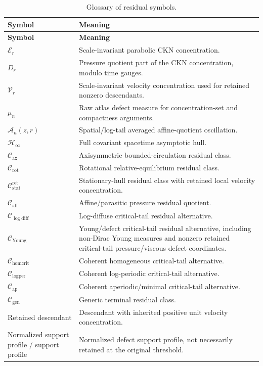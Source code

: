 \documentclass[11pt]{amsart}
\numberwithin{equation}{section}
\theoremstyle{plain}
\theoremstyle{definition}
\theoremstyle{remark}
\newcommand{\calE}{\mathcal E}
\newcommand{\Vel}{\mathcal V}
\newcommand{\calH}{\mathcal H}
\newcommand{\Cax}{\mathcal C_{\mathrm{ax}}}
\newcommand{\Crot}{\mathcal C_{\mathrm{rot}}}
\newcommand{\Cstat}{\mathcal C_{\mathrm{stat}}^{\mathrm{ret}}}
\newcommand{\Caff}{\mathcal C_{\mathrm{aff}}}
\newcommand{\Cgen}{\mathcal C_{\mathrm{gen}}}
\newcommand{\Chomcrit}{\mathcal C_{\mathrm{homcrit}}}
\newcommand{\Clogper}{\mathcal C_{\mathrm{logper}}}
\newcommand{\Capcrit}{\mathcal C_{\mathrm{ap}}}
\newcommand{\Cyoung}{\mathcal C_{\mathrm{Young}}}
\newcommand{\Clogdiff}{\mathcal C_{\log\mathrm{diff}}}
\begin{document}
\begin{longtable}{@{}L{0.28\textwidth}L{0.66\textwidth}@{}}
\caption{Glossary of residual symbols.}
\label{tab:typeI-glossary}\\
\hline
\textbf{Symbol} & \textbf{Meaning}\\
\hline
\endfirsthead
\hline
\textbf{Symbol} & \textbf{Meaning}\\
\hline
\endhead
\hline
\endfoot
\(\calE_r\) & Scale-invariant parabolic CKN concentration.\\
\(D_r\) & Pressure quotient part of the CKN concentration, modulo time gauges.\\
\(\Vel_r\) & Scale-invariant velocity concentration used for retained
nonzero descendants.\\
\(\mu_n\) & Raw atlas defect measure for concentration-set and compactness
arguments.\\
\(\mathcal A_n(z,r)\) & Spatial/log-tail averaged affine-quotient oscillation.\\
\(\calH_\infty\) & Full covariant spacetime asymptotic hull.\\
\(\Cax\) & Axisymmetric bounded-circulation residual class.\\
\(\Crot\) & Rotational relative-equilibrium residual class.\\
\(\Cstat\) & Stationary-hull residual class with retained local velocity concentration.\\
\(\Caff\) & Affine/parasitic pressure residual quotient.\\
\(\Clogdiff\) & Log-diffuse critical-tail residual alternative.\\
\(\Cyoung\) & Young/defect critical-tail residual alternative, including
non-Dirac Young measures and nonzero retained critical-tail pressure/viscous
defect coordinates.\\
\(\Chomcrit\) & Coherent homogeneous critical-tail alternative.\\
\(\Clogper\) & Coherent log-periodic critical-tail alternative.\\
\(\Capcrit\) & Coherent aperiodic/minimal critical-tail alternative.\\
\(\Cgen\) & Generic terminal residual class.\\
Retained descendant & Descendant with inherited positive unit velocity concentration.\\
Normalized support profile / support profile & Normalized defect
support profile, not necessarily retained at the original threshold.\\

\end{longtable}
\end{document}
